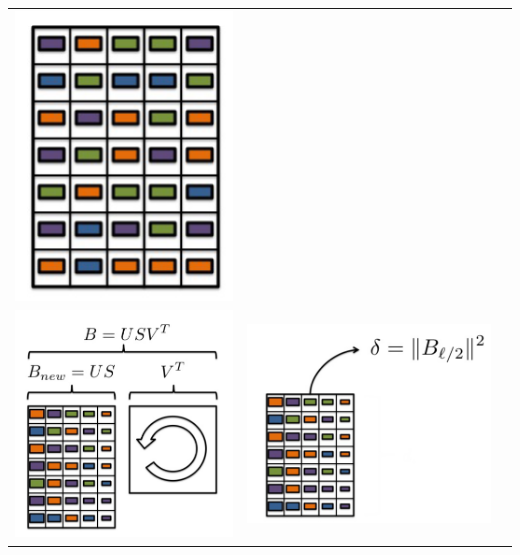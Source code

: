 \documentclass{beamer}
\begin{document}
\begin{frame}
\begin{center}
\begin{tabular}{ccc}
	     		\includegraphics*[scale=0.23]{figures/FD3.png} \\
	     		\includegraphics*[scale=0.23]{figures/FD4.png} &
	     		\includegraphics*[scale=0.23]{figures/FD5.png}  &

\end{tabular}
\end{center}
\end{frame}
\end{document}
